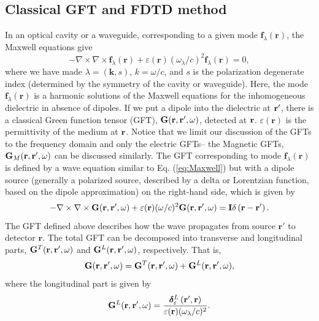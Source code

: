 \subsection{Classical GFT and FDTD method}\label{section:GFT}
In an optical cavity or a waveguide, corresponding to a given mode $\mathbf{f}_\lambda(\mathbf{r})$, the Maxwell equations give~\cite{Wubs2004}
\begin{equation}
 \label{eq:Maxwell}
-\nabla \times \nabla \times \mathbf{f}_\lambda(\mathbf{r}) + \varepsilon(\mathbf{r})(\omega_\lambda/c)^2 \mathbf{f}_\lambda(\mathbf{r}) = 0,
\end{equation}
where we have made $\lambda=(\mathbf{k},s)$, $k=\omega/c$, and $s$ is the polarization degenerate index (determined by the symmetry of the cavity or waveguide). Here, the mode $\mathbf{f}_\lambda(\mathbf{r})$ is
a harmonic solutions of the Maxwell equations for the inhomogeneous dielectric in absence of dipoles. If we put a dipole into the dielectric at ${\bf r}'$, there is a classical Green function tensor (GFT), $\mathbf{G}(\mathbf{r},\mathbf{r}',\omega)$, detected at ${\bf r}$. $\varepsilon(\mathbf{r})$ is the permittivity of the medium at ${\bf r}$.
Notice that we limit our discussion of the GFTs to the frequency domain and only the electric GFTs--
the Magnetic GFTs, $\mathbf{G}_M(\mathbf{r},\mathbf{r}', \omega)$ can be discussed similarly. The GFT corresponding to mode $\mathbf{f}_\lambda(\mathbf{r})$ is defined by a wave equation similar to Eq. (\ref{eq:Maxwell})
but with a dipole source  (generally a polarized source, described by a delta or Lorentzian function, based on the dipole approximation)
on the right-hand side, which is given by
\begin{equation}
\label{def:GEwave}
 -\nabla \times \nabla \times \mathbf{G}(\mathbf{r},\mathbf{r}',\omega) + \varepsilon(\mathbf{r})(\omega/c)^2 \mathbf{G}(\mathbf{r},\mathbf{r}',\omega) = \mathbf{I} \delta \left(\mathbf{r}-\mathbf{r}'\right).
\end{equation}
The GFT defined above describes how the wave propagates from source $\mathbf{r}'$ to detector $\mathbf{r}$. The total GFT can be decomposed into transverse and longitudinal parts, $\mathbf{G}^T(\mathbf{r},\mathbf{r}',\omega)$ and $\mathbf{G}^L(\mathbf{r},\mathbf{r}',\omega)$, respectively. That is,
\begin{equation}
\mathbf{G}(\mathbf{r},\mathbf{r}',\omega)=\mathbf{G}^T(\mathbf{r},\mathbf{r}',\omega)+\mathbf{G}^L(\mathbf{r},\mathbf{r}',\omega),
\end{equation}
where the longitudinal part is given by~\cite{Wubs2004}
\begin{equation}
\label{GL}
\mathbf{G}^L(\mathbf{r},\mathbf{r}',\omega)=\frac{\boldsymbol{\delta}_{\varepsilon}^L \left(\mathbf{r}',\mathbf{r}\right)}{\varepsilon(\mathbf{r})(\omega_\lambda/c)^2}.
\end{equation}
